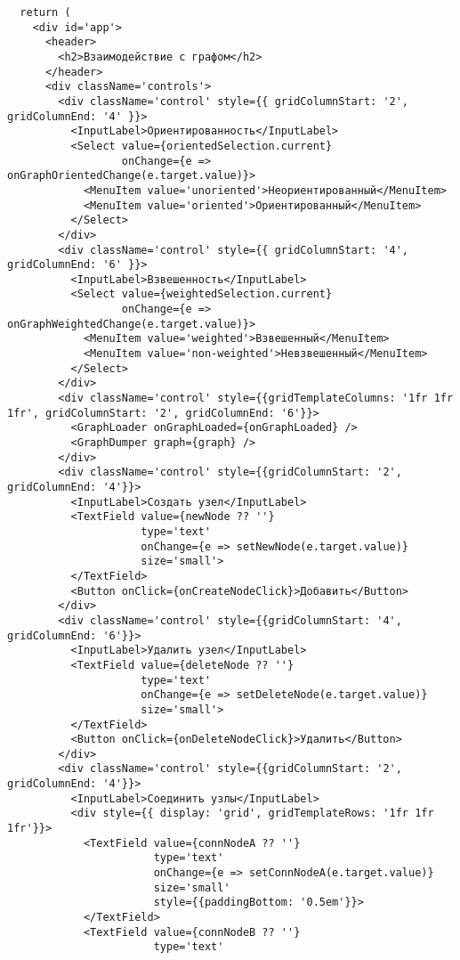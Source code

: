 \begin{verbatim}
  return (
    <div id='app'>
      <header>
        <h2>Взаимодействие с графом</h2>
      </header>
      <div className='controls'>
        <div className='control' style={{ gridColumnStart: '2', gridColumnEnd: '4' }}>
          <InputLabel>Ориентированность</InputLabel>
          <Select value={orientedSelection.current}
                  onChange={e => onGraphOrientedChange(e.target.value)}>
            <MenuItem value='unoriented'>Неориентированный</MenuItem>
            <MenuItem value='oriented'>Ориентированный</MenuItem>
          </Select>
        </div>
        <div className='control' style={{ gridColumnStart: '4', gridColumnEnd: '6' }}>
          <InputLabel>Взвешенность</InputLabel>
          <Select value={weightedSelection.current}
                  onChange={e => onGraphWeightedChange(e.target.value)}>
            <MenuItem value='weighted'>Взвешенный</MenuItem>
            <MenuItem value='non-weighted'>Невзвешенный</MenuItem>
          </Select>
        </div>
        <div className='control' style={{gridTemplateColumns: '1fr 1fr 1fr', gridColumnStart: '2', gridColumnEnd: '6'}}>
          <GraphLoader onGraphLoaded={onGraphLoaded} />
          <GraphDumper graph={graph} />
        </div>
        <div className='control' style={{gridColumnStart: '2', gridColumnEnd: '4'}}>
          <InputLabel>Создать узел</InputLabel>
          <TextField value={newNode ?? ''}
                     type='text'
                     onChange={e => setNewNode(e.target.value)}
                     size='small'>
          </TextField>
          <Button onClick={onCreateNodeClick}>Добавить</Button>
        </div>
        <div className='control' style={{gridColumnStart: '4', gridColumnEnd: '6'}}>
          <InputLabel>Удалить узел</InputLabel>
          <TextField value={deleteNode ?? ''}
                     type='text'
                     onChange={e => setDeleteNode(e.target.value)}
                     size='small'>
          </TextField>
          <Button onClick={onDeleteNodeClick}>Удалить</Button>
        </div>
        <div className='control' style={{gridColumnStart: '2', gridColumnEnd: '4'}}>
          <InputLabel>Соединить узлы</InputLabel>
          <div style={{ display: 'grid', gridTemplateRows: '1fr 1fr 1fr'}}>
            <TextField value={connNodeA ?? ''}
                       type='text'
                       onChange={e => setConnNodeA(e.target.value)}
                       size='small'
                       style={{paddingBottom: '0.5em'}}>
            </TextField>
            <TextField value={connNodeB ?? ''}
                       type='text'

\end{verbatim}
